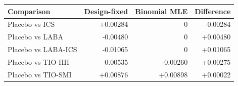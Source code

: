 \begin{tabular}{lrrr}
\toprule
Comparison & Design-fixed & Binomial MLE & Difference \\
\midrule
Placebo vs ICS & +0.00284 & 0 & -0.00284 \\
Placebo vs LABA & -0.00480 & 0 & +0.00480 \\
Placebo vs LABA-ICS & -0.01065 & 0 & +0.01065 \\
Placebo vs TIO-HH & -0.00535 & -0.00260 & +0.00275 \\
Placebo vs TIO-SMI & +0.00876 & +0.00898 & +0.00022 \\
\bottomrule
\end{tabular}
